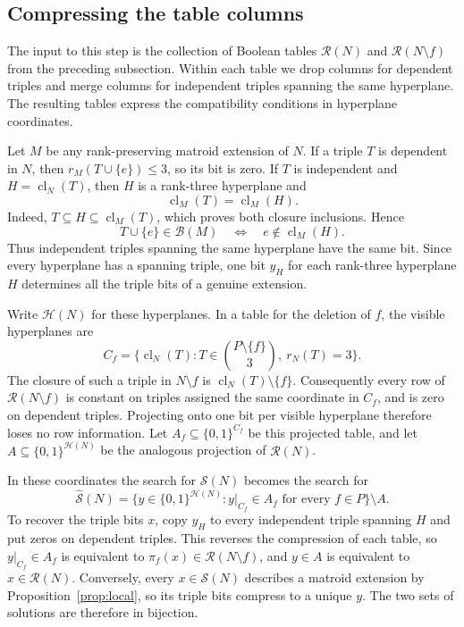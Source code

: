 \documentclass[11pt,a4paper]{article}
\theoremstyle{definition}
\newcommand{\B}{\mathcal B}
\newcommand{\HH}{\mathcal H}
\newcommand{\RR}{\mathcal R}
\newcommand{\cl}{\operatorname{cl}}
\begin{document}
\subsection{Compressing the table columns}

The input to this step is the collection of Boolean tables
$\RR(N)$ and $\RR(N\setminus f)$ from the preceding subsection.
Within each table we drop columns for dependent triples and merge
columns for independent triples spanning the same hyperplane.
The resulting tables express the compatibility conditions in
hyperplane coordinates.

Let $M$ be any rank-preserving matroid extension of $N$. If a triple
$T$ is dependent in $N$, then $r_M(T\cup\{e\})\leq3$, so its bit
is zero. If $T$ is independent and $H=\cl_N(T)$, then $H$ is a
rank-three hyperplane and
\[
 \cl_M(T)=\cl_M(H).
\]
Indeed, $T\subseteq H\subseteq\cl_M(T)$, which proves both closure
inclusions. Hence
\[
 T\cup\{e\}\in\B(M)
 \quad\Longleftrightarrow\quad e\notin\cl_M(H).
\]
Thus independent triples spanning the same hyperplane have the
same bit. Since every hyperplane has a spanning triple, one bit
$y_H$ for each rank-three hyperplane $H$ determines all the triple
bits of a genuine extension.

Write $\HH(N)$ for these hyperplanes. In a table for the deletion
of $f$, the visible hyperplanes are
\[
 C_f=\{\cl_N(T):T\in\binom{P\setminus\{f\}}3,
                              \ r_N(T)=3\}.
\]
The closure of such a triple in $N\setminus f$ is
$\cl_N(T)\setminus\{f\}$. Consequently every row of
$\RR(N\setminus f)$ is constant on triples assigned the same
coordinate in $C_f$, and is zero on dependent triples. Projecting
onto one bit per visible hyperplane therefore loses no row
information. Let $A_f\subseteq\{0,1\}^{C_f}$ be this projected
table, and let $A\subseteq\{0,1\}^{\HH(N)}$ be the analogous
projection of $\RR(N)$.

In these coordinates the search for $\mathcal S(N)$ becomes the
search for
\[
 \widehat{\mathcal S}(N)=
 \{y\in\{0,1\}^{\HH(N)}:
                  y|_{C_f}\in A_f\text{ for every }f\in P\}
                  \setminus A.
\]
To recover the triple bits $x$, copy $y_H$ to every independent
triple spanning $H$ and put zeros on dependent triples. This
reverses the compression of each table, so $y|_{C_f}\in A_f$
is equivalent to $\pi_f(x)\in\RR(N\setminus f)$, and $y\in A$
is equivalent to $x\in\RR(N)$. Conversely, every
$x\in\mathcal S(N)$ describes a matroid extension by
Proposition~\ref{prop:local}, so its triple bits compress to a
unique $y$. The two sets of solutions are therefore in bijection.
\end{document}
